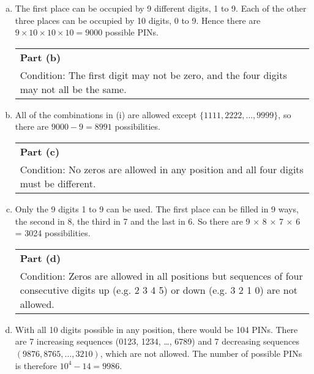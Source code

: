 \documentclass[a4paper,12pt]{article}
\begin{document}
\begin{enumerate}[(a)]
\item The first place can be occupied by 9 different digits, 1 to 9. Each of the other three places can be occupied by 10 digits, 0 to 9.
Hence there are $9 × 10 × 10 × 10 = 9000$ possible PINs.

\begin{table}[ht!]
 \centering
 \begin{tabular}{|p{15cm}|}
 \hline
\noindent \textbf{Part (b)}\\
Condition: The first digit may not be zero, and the four digits may not all be the same.
\\ \hline
  \end{tabular}
\end{table}
\item All of the combinations in (i) are allowed except $\{1111, 2222, \ldots, 9999\}$, so there are $9000 - 9 = 8991$ possibilities.

\newpage
\begin{table}[ht!]
 \centering
 \begin{tabular}{|p{15cm}|}
 \hline
\noindent \textbf{Part (c)}\\
Condition: No zeros are allowed in any position and all four digits must be different.
\\ \hline
  \end{tabular}
\end{table}
\item Only the 9 digits 1 to 9 can be used. The first place can be filled in 9 ways, the second in 8, the third in 7 and the last in 6. So there are 9 × 8 × 7 × 6 = 3024 possibilities.

\begin{table}[ht!]
 \centering
 \begin{tabular}{|p{15cm}|}
 \hline
\noindent \textbf{Part (d)}\\
Condition: Zeros are allowed in all positions but sequences of four consecutive digits up (e.g. 2 3 4 5) or down (e.g. 3 2 1 0) are not allowed.
\\ \hline
  \end{tabular}
\end{table}



\item With all 10 digits possible in any position, there would be 104 PINs. There are 7 increasing sequences (0123, 1234, …, 6789) and 7 decreasing sequences $(9876, 8765, \ldots, 3210)$, which are not allowed. The number of possible PINs is therefore $10^4 - 14 = 9986$.





\end{enumerate}
\end{document}
